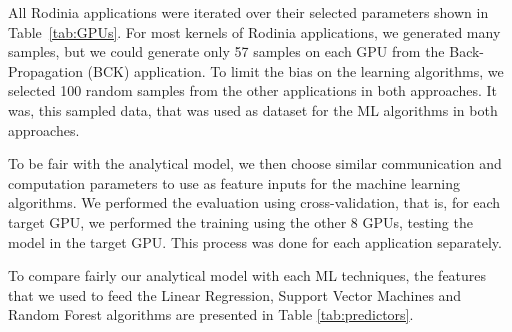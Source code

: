 All Rodinia applications were iterated over their selected parameters shown in Table~\ref{tab:GPUs}. For most kernels of Rodinia applications, we generated many samples, but we could generate only 57 samples on each GPU from the Back-Propagation (BCK) application. To limit the bias on the learning algorithms, we selected 100 random samples from the other applications in both approaches. It was, this sampled data, that was used as dataset for the ML algorithms in both approaches. 

To be fair with the analytical model, we then choose similar communication and computation parameters to use as feature inputs for the machine learning algorithms. We performed the evaluation using cross-validation, that is, for each target GPU, we performed the training using the other 8 GPUs, testing the model in the target GPU. This process was done for each application separately.

To compare fairly our analytical model with each ML techniques, the features that we used to feed the Linear Regression, Support Vector Machines and Random Forest algorithms are presented in Table \ref{tab:predictors}.


